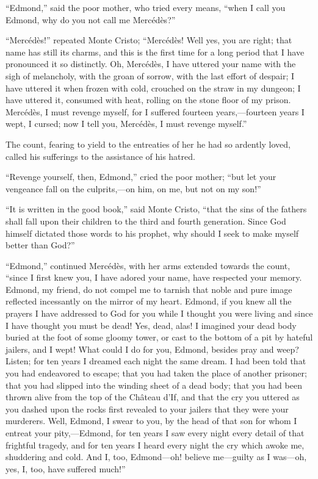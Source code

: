 “Edmond,” said the poor mother, who tried every means, “when I call you
Edmond, why do you not call me Mercédès?”

“Mercédès!” repeated Monte Cristo; “Mercédès! Well yes, you are right;
that name has still its charms, and this is the first time for a long
period that I have pronounced it so distinctly. Oh, Mercédès, I have
uttered your name with the sigh of melancholy, with the groan of
sorrow, with the last effort of despair; I have uttered it when frozen
with cold, crouched on the straw in my dungeon; I have uttered it,
consumed with heat, rolling on the stone floor of my prison. Mercédès,
I must revenge myself, for I suffered fourteen years,—fourteen years I
wept, I cursed; now I tell you, Mercédès, I must revenge myself.”

The count, fearing to yield to the entreaties of her he had so ardently
loved, called his sufferings to the assistance of his hatred.

“Revenge yourself, then, Edmond,” cried the poor mother; “but let your
vengeance fall on the culprits,—on him, on me, but not on my son!”

“It is written in the good book,” said Monte Cristo, “that the sins of
the fathers shall fall upon their children to the third and fourth
generation. Since God himself dictated those words to his prophet, why
should I seek to make myself better than God?”

“Edmond,” continued Mercédès, with her arms extended towards the count,
“since I first knew you, I have adored your name, have respected your
memory. Edmond, my friend, do not compel me to tarnish that noble and
pure image reflected incessantly on the mirror of my heart. Edmond, if
you knew all the prayers I have addressed to God for you while I
thought you were living and since I have thought you must be dead! Yes,
dead, alas! I imagined your dead body buried at the foot of some gloomy
tower, or cast to the bottom of a pit by hateful jailers, and I wept!
What could I do for you, Edmond, besides pray and weep? Listen; for ten
years I dreamed each night the same dream. I had been told that you had
endeavored to escape; that you had taken the place of another prisoner;
that you had slipped into the winding sheet of a dead body; that you
had been thrown alive from the top of the Château d’If, and that the
cry you uttered as you dashed upon the rocks first revealed to your
jailers that they were your murderers. Well, Edmond, I swear to you, by
the head of that son for whom I entreat your pity,—Edmond, for ten
years I saw every night every detail of that frightful tragedy, and for
ten years I heard every night the cry which awoke me, shuddering and
cold. And I, too, Edmond—oh! believe me—guilty as I was—oh, yes, I,
too, have suffered much!”

